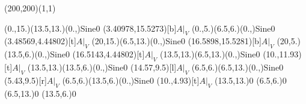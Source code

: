 \unitlength=1bp%

\begin{feynartspicture}(200,200)(1,1)

\FADiagram{}
\FAProp(0.,15.)(13.5,13.)(0.,){Sine}{0}
\FALabel(3.40978,15.5273)[b]{$A|_V$}
\FAProp(0.,5.)(6.5,6.)(0.,){Sine}{0}
\FALabel(3.48569,4.44802)[t]{$A|_V$}
\FAProp(20,15.)(6.5,13.)(0.,){Sine}{0}
\FALabel(16.5898,15.5281)[b]{$A|_V$}
\FAProp(20,5.)(13.5,6.)(0.,){Sine}{0}
\FALabel(16.5143,4.44802)[t]{$A|_V$}
\FAProp(13.5,13.)(6.5,13.)(0.,){Sine}{0}
\FALabel(10.,11.93)[t]{$A|_V$}
\FAProp(13.5,13.)(13.5,6.)(0.,){Sine}{0}
\FALabel(14.57,9.5)[l]{$A|_V$}
\FAProp(6.5,6.)(6.5,13.)(0.,){Sine}{0}
\FALabel(5.43,9.5)[r]{$A|_V$}
\FAProp(6.5,6.)(13.5,6.)(0.,){Sine}{0}
\FALabel(10.,4.93)[t]{$A|_V$}
\FAVert(13.5,13.){0}
\FAVert(6.5,6.){0}
\FAVert(6.5,13.){0}
\FAVert(13.5,6.){0}
\end{feynartspicture}


